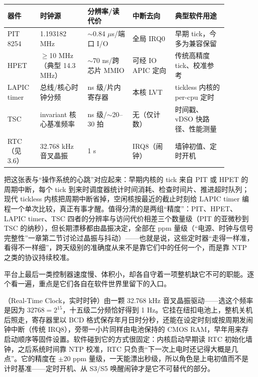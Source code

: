 \begin{longtable}{L{0.13\linewidth}L{0.19\linewidth}L{0.18\linewidth}L{0.17\linewidth}L{0.21\linewidth}}
\toprule
器件 & 时钟源 & 分辨率/读代价 & 中断去向 & 典型软件用途 \\
\midrule
PIT 8254 & 1.193182 MHz & $\sim$0.84 $\mu$s/端口 I/O & 全局 IRQ0 & 早期 tick，今多为兼容保留 \\\tablerowrule
HPET & $\geq$10 MHz（典型 14.3 MHz） & $\sim$70 ns/跨芯片 MMIO & 可经 IO APIC 定向 & 传统高精度 tick、校准参考 \\\tablerowrule
LAPIC timer & 总线/核心时钟分频 & ns 级/片内寄存器 & 本核 LVT & tickless 内核的 per-cpu 定时 \\\tablerowrule
TSC & invariant 核心基准频率 & ns 级/$\sim$20--30 拍 & 无（仅计数） & 时间戳、vDSO 快路径、性能测量 \\\tablerowrule
RTC（见 3.6） & 32.768 kHz 音叉晶振 & 1 s & IRQ8（闹钟） & 墙钟初值、定时开机 \\
\bottomrule
\end{longtable}

把这张表与“操作系统的心跳”对应起来：早期内核的 tick 来自 PIT 或 HPET 的周期中断，每个 tick 到来时调度器统计时间消耗、检查时间片、推进超时队列；现代 tickless 内核把周期中断省掉，空闲核按最近的截止时刻给 LAPIC timer 编程一个单次比较，真正有事才醒。值得分清的是两组“精度”：PIT、HPET、LAPIC timer、TSC 四者的分辨率与访问代价相差三个数量级（PIT 的亚微秒到 TSC 的纳秒），但长期漂移都由晶振决定，全部在 ppm 量级（“电源、时钟与信号完整性”一章第二节讨论过晶振与抖动）——也就是说，这些定时器“走得一样准，看得不一样细”，跨天级别的准确度从来不是靠它们中的任何一个，而是靠 NTP 之类的协议持续校准。


平台上最后一类控制器速度慢、体积小，却各自守着一项整机缺它不可的职能。逐个看一遍，重点是它们各自在软件世界里留下的入口。

（Real-Time Clock，实时时钟）由一颗 32.768 kHz 音叉晶振驱动——选这个频率是因为 $32768=2^{15}$，十五级二分频恰好得到 1 Hz。它挂在纽扣电池上，整机关机后照走，寄存器里以 BCD 格式保存年月日时分秒，还能在设定时刻或按周期发闹钟中断（传统 IRQ8），旁带一小片同样由电池保持的 CMOS RAM，早年用来存启动顺序等固件设置。软件碰到它的方式很固定：内核启动早期读 RTC 初始化墙钟，之后系统时间靠 NTP 校准，RTC 只负责“下一次上电时还记得大概是几点”。它的精度在 $\pm$20 ppm 量级，一天能漂出秒级，所以角色是上电初值而不是计时基准——定时开机、从 S3/S5 唤醒闹钟才是它不可替代的部分。

